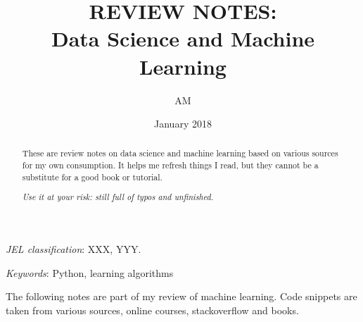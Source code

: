 \documentclass[12pt]{article}
\begin{document}


\title{REVIEW NOTES: \\
	Data Science and Machine Learning    
	}


\author{AM %
        }

\date{January 2018}  %


\renewcommand{\thefootnote}{\fnsymbol{footnote}}   

\singlespacing

\maketitle

\vspace{-.2in}
\begin{abstract}
\noindent These are review notes on data science and machine learning based on various sources for my own consumption. It helps me refresh things I read, but they cannot be a substitute for a good book or tutorial.

\centering\textit{Use it at your risk: still full of typos and unfinished.} 
\end{abstract}

\medskip

\noindent \textit{JEL classification}: XXX, YYY.

\medskip
\noindent \textit{Keywords}: Python, learning algorithms %

\clearpage

\tableofcontents

\thispagestyle{empty}

\clearpage

\onehalfspacing
\setcounter{footnote}{0}
\renewcommand{\thefootnote}{\arabic{footnote}}
\setcounter{page}{1}
The following notes are part of my review of machine learning. Code snippets are taken from various sources, online courses, stackoverflow and books. 
\end{document}
